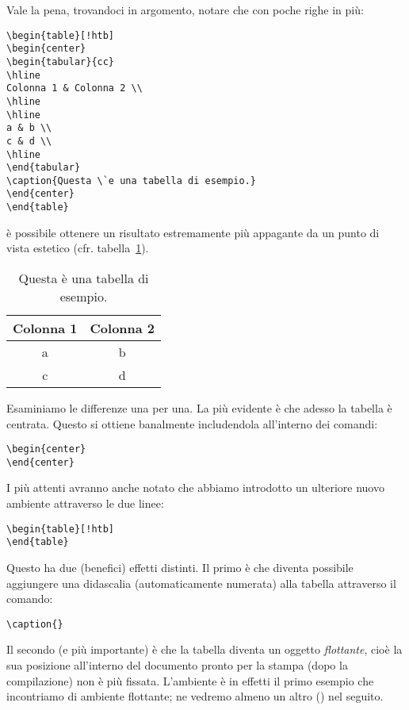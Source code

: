 Vale la pena, trovandoci in argomento, notare che con poche righe in pi\`u:
\begin{verbatim}
\begin{table}[!htb]
\begin{center}
\begin{tabular}{cc}
\hline
Colonna 1 & Colonna 2 \\
\hline
\hline
a & b \\
c & d \\
\hline
\end{tabular}
\caption{Questa \`e una tabella di esempio.}
\end{center}
\end{table}
\end{verbatim}
\`e possibile ottenere un risultato estremamente pi\`u appagante da un punto
di vista estetico (cfr. tabella~\ref{tabella_esempio}).
\begin{table}[htb!]
\begin{center}
\begin{tabular}{cc}
\hline
Colonna 1 & Colonna 2 \\
\hline
\hline
a & b \\
c & d \\
\hline
\end{tabular}
\caption{Questa \`e una tabella di esempio.}
\label{tabella_esempio}
\end{center}
\end{table}
Esaminiamo le differenze una per una. La pi\`u evidente \`e che adesso la
tabella \`e centrata. Questo si ottiene banalmente includendola all'interno dei
comandi:
\begin{verbatim}
\begin{center}
\end{center}
\end{verbatim}
I pi\`u attenti avranno anche notato che abbiamo introdotto un ulteriore nuovo
ambiente attraverso le due linee:
\begin{verbatim}
\begin{table}[!htb]
\end{table}
\end{verbatim}
Questo ha due (benefici) effetti distinti. Il primo \`e che diventa possibile
aggiungere una didascalia (automaticamente numerata) alla tabella attraverso
il comando:
\begin{verbatim}
\caption{}
\end{verbatim}
Il secondo (e pi\`u importante) \`e che la tabella diventa un oggetto
\emph{flottante}, cio\`e la sua posizione all'interno del documento pronto
per la stampa (dopo la compilazione) non \`e pi\`u fissata.
L'ambiente  \`e in effetti il primo esempio che incontriamo di
ambiente flottante; ne vedremo almeno un altro () nel seguito.

